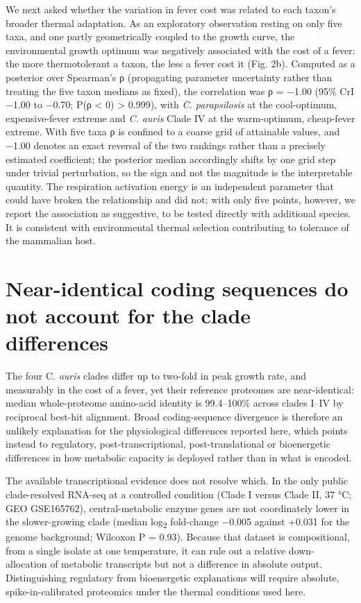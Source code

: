 \documentclass[
]{article}
\begin{document}
We next asked whether the variation in fever cost was related to each
taxon's broader thermal adaptation. As an exploratory observation
resting on only five taxa, and one partly geometrically coupled to the
growth curve, the environmental growth optimum was negatively associated
with the cost of a fever: the more thermotolerant a taxon, the less a
fever cost it (Fig. 2b). Computed as a posterior over Spearman's ρ
(propagating parameter uncertainty rather than treating the five taxon
medians as fixed), the correlation was ρ = −1.00 (95\% CrI −1.00 to
−0.70; P(ρ \textless{} 0) \textgreater{} 0.999), with \emph{C.
parapsilosis} at the cool-optimum, expensive-fever extreme and \emph{C.
auris} Clade IV at the warm-optimum, cheap-fever extreme. With five taxa
ρ is confined to a coarse grid of attainable values, and −1.00 denotes
an exact reversal of the two rankings rather than a precisely estimated
coefficient; the posterior median accordingly shifts by one grid step
under trivial perturbation, so the sign and not the magnitude is the
interpretable quantity. The respiration activation energy is an
independent parameter that could have broken the relationship and did
not; with only five points, however, we report the association as
suggestive, to be tested directly with additional species. It is
consistent with environmental thermal selection contributing to
tolerance of the mammalian host.

\section{\texorpdfstring{\textbf{Near-identical coding sequences do not
account for the clade
differences}}{Near-identical coding sequences do not account for the clade differences}}\label{near-identical-coding-sequences-do-not-account-for-the-clade-differences}

The four C. \emph{auris} clades differ up to two-fold in peak growth
rate, and measurably in the cost of a fever, yet their reference
proteomes are near-identical: median whole-proteome amino-acid identity
is 99.4--100\% across clades I--IV by reciprocal best-hit alignment.
Broad coding-sequence divergence is therefore an unlikely explanation
for the physiological differences reported here, which points instead to
regulatory, post-transcriptional, post-translational or bioenergetic
differences in how metabolic capacity is deployed rather than in what is
encoded.

The available transcriptional evidence does not resolve which. In the
only public clade-resolved RNA-seq at a controlled condition (Clade I
versus Clade II, 37 °C; GEO GSE165762), central-metabolic enzyme genes
are not coordinately lower in the slower-growing clade (median
log\textsubscript{2} fold-change −0.005 against +0.031 for the genome
background; Wilcoxon P = 0.93). Because that dataset is compositional,
from a single isolate at one temperature, it can rule out a relative
down-allocation of metabolic transcripts but not a difference in
absolute output. Distinguishing regulatory from bioenergetic
explanations will require absolute, spike-in-calibrated proteomics under
the thermal conditions used here.
\end{document}
